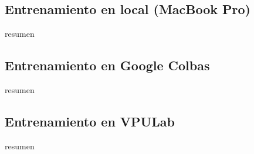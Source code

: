 

\subsection{Entrenamiento en local (MacBook Pro)}
resumen

\subsection{Entrenamiento en Google Colbas}
resumen

\subsection{Entrenamiento en VPULab}
resumen